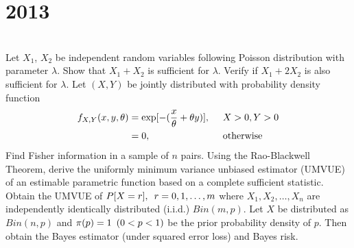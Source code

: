 \section*{2013}
\vspace{-.5cm}
\hrulefill \smallskip\\
 Let $X_1$, $X_2$ be independent random variables following Poisson distribution with parameter $\lambda$. Show that $X_1 + X_2$ is sufficient for $\lambda$. Verify if $X_1 + 2X_2$ is also sufficient for $\lambda$.
\myline
{} Let $(X,Y)$ be jointly distributed with probability density function \[ \begin{aligned}f_{X,Y}(x,y,\theta) &= \exp[- (\frac{x}{\theta} + \theta y)], \enskip &&X> 0, Y>0 \\
&=0, &&\text{otherwise}
\end{aligned}\] Find Fisher information in a sample of $n$ pairs.
\myline
{} Using the Rao-Blackwell Theorem, derive the uniformly minimum variance unbiased estimator (UMVUE) of an estimable parametric function based on  a complete sufficient statistic.\\ Obtain the UMVUE of $P[X =r], \enskip r=0,1,\dotsc,m$ where $X_1,X_2,\dotsc,X_n$ are independently identically distributed (i.i.d.) $Bin(m,p)$.
\myline
{} Let $X$ be distributed as $Bin(n,p)$ and $\pi(p) = 1 \enskip(0 <p<1)$ be the prior probability density of $p$. Then obtain the Bayes estimator (under squared error loss) and Bayes risk.
